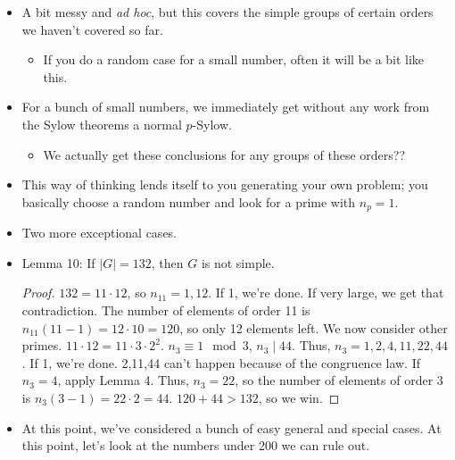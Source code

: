 \documentclass[../notes.tex]{subfiles}
\begin{document}
\begin{itemize}
\begin{proof}
        $176=11\cdot 16$. Sylow III: $n_{11}\equiv 1\mod 11$, $n_{11}\mid 16$ implies $n_{11}=1$.\par
        $176=11\cdot 18$. Sylow III: $n_{11}\equiv 1\mod 11$, $n_{11}\mid 18$ implies $n_{11}=1$.\par\smallskip
        $175=5^2\cdot 7$. Sylow III: $n_5\equiv 1\mod 5$, $n_5\mid 7$ implies $n_5=1$.\par
        $200=5^2\cdot 8$. Sylow III: $n_5\equiv 1\mod 5$, $n_5\mid 8$ implies $n_5=1$.\par\smallskip
        $156=13\cdot 12$. Sylow III: $n_{13}\equiv 1\mod 13$, $n_{13}\mid 12$ implies $n_{13}=1$.
    \end{proof}
    \item A bit messy and \emph{ad hoc}, but this covers the simple groups of certain orders we haven't covered so far.
    \begin{itemize}
        \item If you do a random case for a small number, often it will be a bit like this.
    \end{itemize}
    \item For a bunch of small numbers, we immediately get without any work from the Sylow theorems a normal $p$-Sylow.
    \begin{itemize}
        \item We actually get these conclusions for any groups of these orders??
    \end{itemize}
    \item This way of thinking lends itself to you generating your own problem; you basically choose a random number and look for a prime with $n_p=1$.
    \item Two more exceptional cases.
    \item Lemma 10: If $|G|=132$, then $G$ is not simple.
    \begin{proof}
        $132=11\cdot 12$, so $n_{11}=1,12$. If 1, we're done. If very large, we get that contradiction. The number of elements of order 11 is $n_{11}(11-1)=12\cdot 10=120$, so only 12 elements left. We now consider other primes. $11\cdot 12=11\cdot 3\cdot 2^2$. $n_3\equiv 1\mod 3$, $n_3\mid 44$. Thus, $n_3=1,2,4,11,22,44$. If 1, we're done. 2,11,44 can't happen because of the congruence law. If $n_3=4$, apply Lemma 4. Thus, $n_3=22$, so the number of elements of order 3 is $n_3(3-1)=22\cdot 2=44$. $120+44>132$, so we win.
    \end{proof}
    \item At this point, we've considered a bunch of easy general and special cases. At this point, let's look at the numbers under 200 we can rule out.

\end{itemize}
\end{document}
